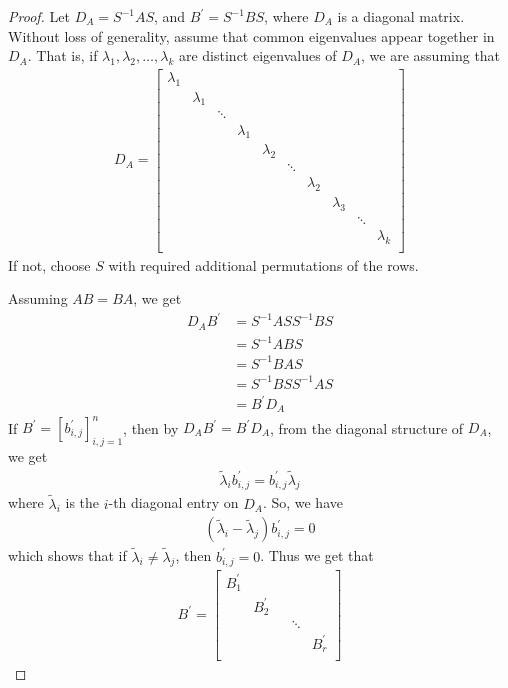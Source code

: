 \documentclass[12pt]{article}
\theoremstyle{definition}
\theoremstyle{remark}
\begin{document}
\begin{proof}
  Let $D_A = S^{-1} A S$, and $B^\prime = S^{-1} B S$, where $D_A$ is
  a diagonal matrix. Without loss of generality, assume that common
  eigenvalues appear together in $D_A$. That is, if $\lambda_1 ,
  \lambda_2 , \ldots , \lambda_k$ are distinct eigenvalues of $D_A$,
  we are assuming that
  \begin{align*}
    D_A =
    \begin{bmatrix}%
      \lambda_1&  &  &  &  &  &  &  &  &  \\
      & \lambda_1 &  &  &  &  &  &  &  &  \\
      &  & \ddots &  &  &  &  &  &  &  \\
      &  &  & \lambda_1 &  &  &  &  &  &  \\
      &  &  &  & \lambda_2  &  &  &  &  &  \\
      &  &  &  &  & \ddots  &  &  &  &  \\
      &  &  &  &  &  & \lambda_2  &  &  &  \\
      &  &  &  &  &  &  & \lambda_3 &  &  \\
      &  &  &  &  &  &  &  &  \ddots &  \\
      &  &  &  &  &  &  &  &  & \lambda_k \\
    \end{bmatrix}
  \end{align*}
  If not, choose $S$ with required
  additional permutations of the rows.

  Assuming $AB = BA$, we get
  \begin{align*}
    D_AB^\prime &= S^{-1} ASS^{-1}BS \\
    &= S^{-1}ABS \\
    &= S^{-1}BAS \\
    &= S^{-1}BSS^{-1}AS \\
    &= B^\prime D_A
  \end{align*}
  If $B^\prime = [b_{i, j}^\prime]_{i, j = 1}^n$, then by $D_A
  B^\prime = B^\prime D_A$, from the diagonal structure of $D_A$, we get
  \begin{align*}
    \tilde{\lambda}_ib_{i, j}^\prime = b_{i, j}^\prime \tilde{\lambda}_j
  \end{align*}
  where $\tilde{\lambda}_i$ is the $i$-th diagonal entry on $D_A$.
  So, we have
  \begin{align*}
    (\tilde{ \lambda}_i - \tilde{\lambda}_j) b_{i, j}^\prime = 0
  \end{align*}
  which shows that if $\tilde{ \lambda}_i \neq \tilde{\lambda}_j$,
  then $b_{i, j}^\prime = 0$. Thus we get that
  \begin{align*}
    B^\prime =
    \begin{bmatrix}%
      B_1^\prime &  &  & \\
      & B_2^\prime &   & \\
      &  &  & \ddots  & \\
      &  & &   & B_r^\prime \\
    \end{bmatrix}
  \end{align*}


\end{proof}
\end{document}
